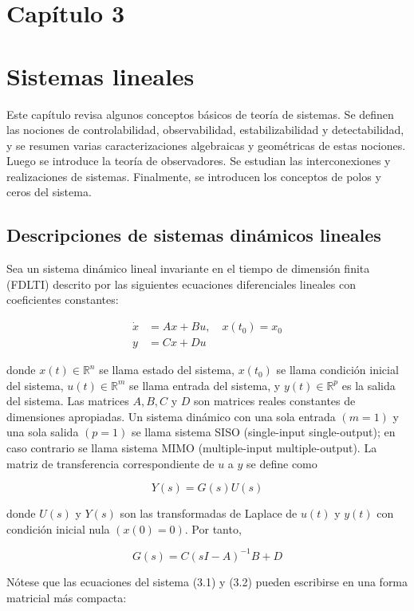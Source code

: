 \documentclass[11pt]{article}
\begin{document}
\section*{Capítulo 3}

\section*{Sistemas lineales}
Este capítulo revisa algunos conceptos básicos de teoría de sistemas. Se definen las nociones de controlabilidad, observabilidad, estabilizabilidad y detectabilidad, y se resumen varias caracterizaciones algebraicas y geométricas de estas nociones. Luego se introduce la teoría de observadores. Se estudian las interconexiones y realizaciones de sistemas. Finalmente, se introducen los conceptos de polos y ceros del sistema.

\subsection*{Descripciones de sistemas dinámicos lineales}
Sea un sistema dinámico lineal invariante en el tiempo de dimensión finita (FDLTI) descrito por las siguientes ecuaciones diferenciales lineales con coeficientes constantes:


\begin{align*}
\dot{x} & =A x+B u, \quad x\left(t_{0}\right)=x_{0}  \tag{3.1}\\
y & =C x+D u \tag{3.2}
\end{align*}


donde $x(t) \in \mathbb{R}^{n}$ se llama estado del sistema, $x\left(t_{0}\right)$ se llama condición inicial del sistema, $u(t) \in \mathbb{R}^{m}$ se llama entrada del sistema, y $y(t) \in \mathbb{R}^{p}$ es la salida del sistema. Las matrices $A, B, C$ y $D$ son matrices reales constantes de dimensiones apropiadas. Un sistema dinámico con una sola entrada $(m=1)$ y una sola salida $(p=1)$ se llama sistema SISO (single-input single-output); en caso contrario se llama sistema MIMO (multiple-input multiple-output). La matriz de transferencia correspondiente de $u$ a $y$ se define como

$$
Y(s)=G(s) U(s)
$$

donde $U(s)$ y $Y(s)$ son las transformadas de Laplace de $u(t)$ y $y(t)$ con condición inicial nula $(x(0)=0)$. Por tanto,

$$
G(s)=C(s I-A)^{-1} B+D
$$

Nótese que las ecuaciones del sistema (3.1) y (3.2) pueden escribirse en una forma matricial más compacta:
\end{document}

